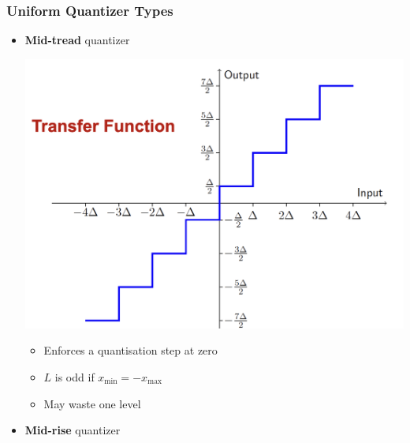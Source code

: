\documentclass[oneside]{book}
\begin{document}
            \subsubsection{Uniform Quantizer Types}
                \begin{itemize}[label=--]
                    \item \textbf{Mid-tread} quantizer\\
                    \begin{minipage}[t]{0.35\linewidth}
                        \includegraphics[width=\textwidth]{figures/mid_riser_transfer_function.png}
                    \end{minipage}
                    \begin{minipage}[t]{0.45\linewidth}
                        \begin{itemize}
                            \item Enforces a quantisation step at zero
                            \item $L$ is odd if $x_{\text{min}} = -x_{\text{max}}$
                            \item May waste one level
                        \end{itemize}
                    \end{minipage}
                    \item \textbf{Mid-rise} quantizer\\
                    \begin{minipage}[t]{0.35\linewidth}

\end{minipage}
\end{itemize}
\end{document}

